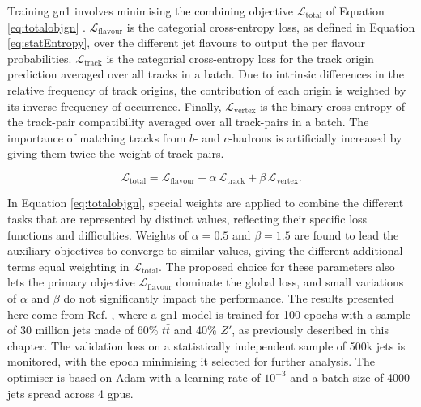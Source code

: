 Training \gls{gn1} involves minimising the combining objective $\mathcal{L}_{\textrm{total}}$ of Equation \ref{eq:totalobjgn} \cite{ATL-PHYS-PUB-2022-027}. $\mathcal{L}_{\textrm{flavour}}$ is the categorial cross-entropy loss, as defined in Equation \ref{eq:statEntropy}, over the different jet flavours to output the per flavour probabilities. $\mathcal{L}_{\textrm{track}}$ is the categorial cross-entropy loss for the track origin prediction averaged over all tracks in a batch. Due to intrinsic differences in the relative frequency of track origins, the contribution of each origin is weighted by its inverse frequency of occurrence. Finally, $\mathcal{L}_{\textrm{vertex}}$ is the binary cross-entropy of the track-pair compatibility averaged over all track-pairs in a batch. The importance of matching tracks from $b$- and $c$-hadrons is artificially increased by giving them twice the weight of track pairs.

\begin{equation}\label{eq:totalobjgn}
  \mathcal{L}_{\textrm{total}} = \mathcal{L}_{\textrm{flavour}} + \alpha \, \mathcal{L}_{\textrm{track}} + \beta \, \mathcal{L}_{\textrm{vertex}}.
\end{equation}

In Equation \ref{eq:totalobjgn}, special weights are applied to combine the different tasks that are represented by distinct values, reflecting their specific loss functions and difficulties. Weights of $\alpha = 0.5$ and $\beta = 1.5$ \cite{ATL-PHYS-PUB-2022-027} are found to lead the auxiliary objectives to converge to similar values, giving the different additional terms equal weighting in $\mathcal{L}_{\textrm{total}}$. The proposed choice for these parameters also lets the primary objective $\mathcal{L}_{\textrm{flavour}}$ dominate the global loss, and small variations of $\alpha$ and $\beta$ do not significantly impact the performance. The results presented here come from Ref. \cite{ATL-PHYS-PUB-2022-027}, where a \gls{gn1} model is trained for 100 epochs with a sample of 30 million jets made of 60\% $t\bar{t}$ and 40\% $Z'$, as previously described in this chapter. The validation loss on a statistically independent sample of 500k jets is monitored, with the epoch minimising it selected for further analysis. The optimiser is based on Adam \cite{adamPaper} with a learning rate of $10^{-3}$ and a batch size of 4000 jets spread across 4 \glspl{gpu}. \\



